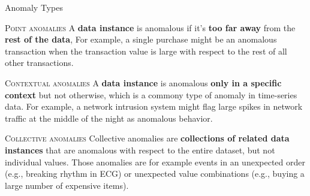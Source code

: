 \documentclass[document.tex]{subfiles}
\begin{document}
    \begin{frame}{Anomaly Types}
        \begin{alertblock}{\textsc{Point anomalies}}
            A \textbf{data instance} is anomalous if it's \textbf{too far away} from the \textbf{rest of the data}, For example, a single purchase might be an anomalous transaction when the transaction value is large with respect to the rest of all other transactions.
        \end{alertblock}
        \begin{alertblock}{\textsc{Contextual anomalies}}
            A \textbf{data instance} is anomalous \textbf{only in a specific context} but not otherwise, which is a commony type of anomaly in time-series data. For example, a network intrusion system might flag large spikes in network traffic at the middle of the night as anomalous behavior.
        \end{alertblock}
        \begin{alertblock}{\textsc{Collective anomalies}}
            Collective anomalies are \textbf{collections of related data instances} that are anomalous with respect to the entire dataset, but not individual values. Those anomalies are for example events in an unexpected order (e.g., breaking rhythm in ECG) or unexpected value combinations (e.g., buying a large number of expensive items).
        \end{alertblock}
    \end{frame}
    
\end{document}
